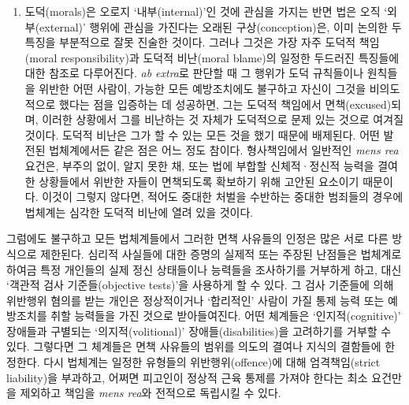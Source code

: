 \begin{enumerate}
\def\labelenumi{(\roman{enumi})}
\setcounter{enumi}{2}
\tightlist
\item
   도덕(morals)은 오로지 ‘내부(internal)’인 것에 관심을
  가지는 반면 법은 오직 ‘외부(external)’ 행위에 관심을 가진다는 오래된
  구상(conception)은, 이미 논의한 두 특징을 부분적으로 잘못 진술한
  것이다. 그러나 그것은 가장 자주 도덕적 책임(moral responsibility)과
  도덕적 비난(moral blame)의 일정한 두드러진 특징들에 대한 참조로
  다루어진다. \emph{ab extra}로 판단할 때 그 행위가 도덕 규칙들이나
  원칙들을 위반한 어떤 사람이, 가능한 모든 예방조치에도 불구하고 자신이
  그것을 비의도적으로 했다는 점을 입증하는 데 성공하면, 그는 도덕적
  책임에서 면책(excused)되며, 이러한 상황에서 그를 비난하는 것 자체가
  도덕적으로 문제 있는 것으로 여겨질 것이다. 도덕적 비난은 그가 할 수
  있는 모든 것을 했기 때문에 배제된다. 어떤 발전된 법체계에서든 같은
  점은 어느 정도 참이다. 형사책임에서 일반적인 \emph{mens rea} 요건은,
  부주의 없이, 알지 못한 채, 또는 법에 부합할 신체적·정신적 능력을
  결여한 상황들에서 위반한 자들이 면책되도록 확보하기 위해 고안된
  요소이기 때문이다. 이것이 그렇지 않다면, 적어도 중대한 처벌을 수반하는
  중대한 범죄들의 경우에 법체계는 심각한 도덕적 비난에 열려 있을 것이다.
\end{enumerate}

그럼에도 불구하고 모든 법체계들에서 그러한 면책 사유들의 인정은 많은
서로 다른 방식으로 제한된다. 심리적 사실들에 대한 증명의 실제적 또는
주장된 난점들은 법체계로 하여금 특정 개인들의 실제 정신 상태들이나
능력들을 조사하기를 거부하게 하고, 대신 ‘객관적 검사 기준들(objective
tests)’을 사용하게 할 수 있다. 그 검사 기준들에 의해 위반행위 혐의를
받는 개인은 정상적이거나 ‘합리적인’ 사람이 가질 통제 능력 또는
예방조치를 취할 능력들을 가진 것으로 받아들여진다. 어떤 체계들은
‘인지적(cognitive)’ 장애들과 구별되는 ‘의지적(volitional)’
장애들(disabilities)을 고려하기를 거부할 수 있다. 그렇다면 그 체계들은
면책 사유들의 범위를 의도의 결여나 지식의 결함들에 한정한다. 다시
법체계는 일정한 유형들의 위반행위(offence)에 대해 엄격책임(strict
liability)을 부과하고, 어쩌면 피고인이 정상적 근육 통제를 가져야 한다는
최소 요건만을 제외하고 책임을 \emph{mens rea}와 전적으로 독립시킬 수
있다.

